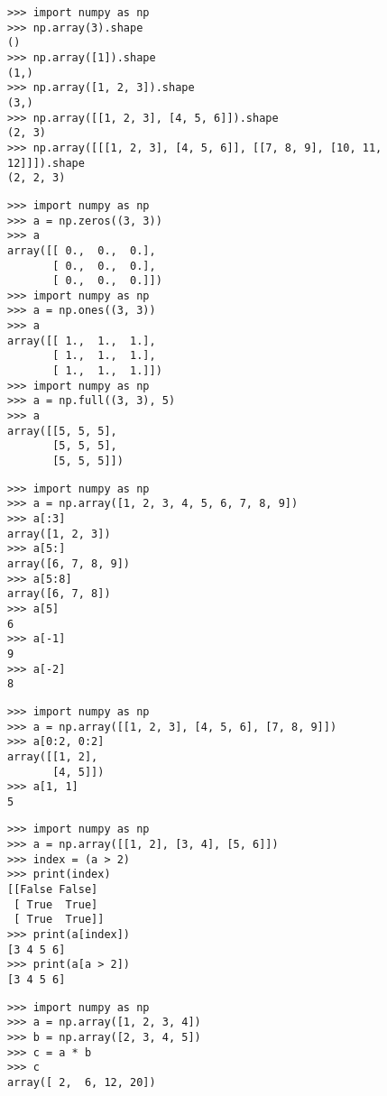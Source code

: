 \begin{verbatim}
>>> import numpy as np
>>> np.array(3).shape
()
>>> np.array([1]).shape
(1,)
>>> np.array([1, 2, 3]).shape
(3,)
>>> np.array([[1, 2, 3], [4, 5, 6]]).shape
(2, 3)
>>> np.array([[[1, 2, 3], [4, 5, 6]], [[7, 8, 9], [10, 11, 12]]]).shape
(2, 2, 3)
\end{verbatim}

\begin{verbatim}
>>> import numpy as np
>>> a = np.zeros((3, 3))
>>> a
array([[ 0.,  0.,  0.],
       [ 0.,  0.,  0.],
       [ 0.,  0.,  0.]])
>>> import numpy as np
>>> a = np.ones((3, 3))
>>> a
array([[ 1.,  1.,  1.],
       [ 1.,  1.,  1.],
       [ 1.,  1.,  1.]])
>>> import numpy as np
>>> a = np.full((3, 3), 5)
>>> a
array([[5, 5, 5],
       [5, 5, 5],
       [5, 5, 5]])
\end{verbatim}


\begin{verbatim}
>>> import numpy as np
>>> a = np.array([1, 2, 3, 4, 5, 6, 7, 8, 9])
>>> a[:3]
array([1, 2, 3])
>>> a[5:]
array([6, 7, 8, 9])
>>> a[5:8]
array([6, 7, 8])
>>> a[5]
6
>>> a[-1]
9
>>> a[-2]
8
\end{verbatim}


\begin{verbatim}
>>> import numpy as np
>>> a = np.array([[1, 2, 3], [4, 5, 6], [7, 8, 9]])
>>> a[0:2, 0:2]
array([[1, 2],
       [4, 5]])
>>> a[1, 1]
5
\end{verbatim}


\begin{verbatim}
>>> import numpy as np
>>> a = np.array([[1, 2], [3, 4], [5, 6]])
>>> index = (a > 2)
>>> print(index)
[[False False]
 [ True  True]
 [ True  True]]
>>> print(a[index])
[3 4 5 6]
>>> print(a[a > 2])
[3 4 5 6]
\end{verbatim}


\begin{verbatim}
>>> import numpy as np
>>> a = np.array([1, 2, 3, 4])
>>> b = np.array([2, 3, 4, 5])
>>> c = a * b
>>> c
array([ 2,  6, 12, 20])
\end{verbatim}

